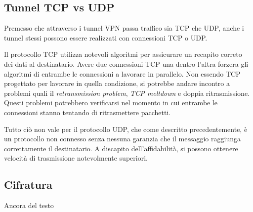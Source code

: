 \subsection{Tunnel TCP vs UDP}
Premesso che attraverso i tunnel VPN passa traffico sia TCP che UDP, anche i tunnel stessi possono essere realizzati con connessioni TCP o UDP.

Il protocollo TCP utilizza notevoli algoritmi per assicurare un recapito correto dei dati al destinatario. Avere due connessioni TCP una dentro l'altra forzera gli algoritmi di entrambe le connessioni a lavorare in parallelo. Non essendo TCP progettato per lavorare in quella condizione, si potrebbe andare incontro a problemi quali il \emph{retransmission problem}, \emph{TCP meltdown} e doppia ritrasmissione. Questi problemi potrebbero verificarsi nel momento in cui entrambe le connessioni stanno tentando di ritrasmettere pacchetti.

Tutto ciò non vale per il protocollo UDP, che come descritto precedentemente, è un protocollo non connesso senza nessuna garanzia che il messaggio raggiunga correttamente il destinatario. A discapito dell'affidabilità, si possono ottenere velocità di trasmissione notevolmente superiori.


\subsection{Cifratura}
Ancora del testo

